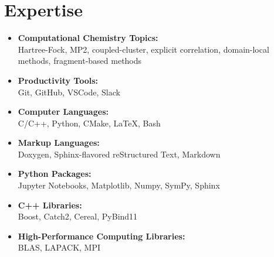 \documentclass[11pt,a4paper,sans]{moderncv}
\begin{document}
\section{Expertise}
\begin{itemize}
	\item{\textbf{Computational Chemistry Topics:}\\
		  Hartree-Fock, MP2, coupled-cluster, explicit correlation,
		  domain-local methods, fragment-based methods}
	\item{\textbf{Productivity Tools:}\\
		  Git, GitHub, VSCode, Slack}
	\item{\textbf{Computer Languages:}\\
		  C/C++, Python, CMake, \LaTeX, Bash}
	\item{\textbf{Markup Languages:}\\
		  Doxygen, Sphinx-flavored reStructured Text, Markdown}
	\item{\textbf{Python Packages:}\\
		  Jupyter Notebooks, Matplotlib, Numpy, SymPy, Sphinx}
	\item{\textbf{C++ Libraries:}\\
		  Boost, Catch2, Cereal, PyBind11}
	\item{\textbf{High-Performance Computing Libraries:}\\
		  BLAS, LAPACK, MPI}
\end{itemize}
\end{document}

